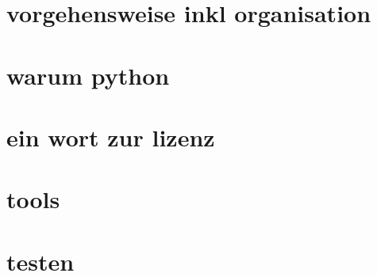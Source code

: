  
\section{vorgehensweise inkl organisation}
\section{warum python} %
\section{ein wort zur lizenz} %
\section{tools}
\section{testen}




